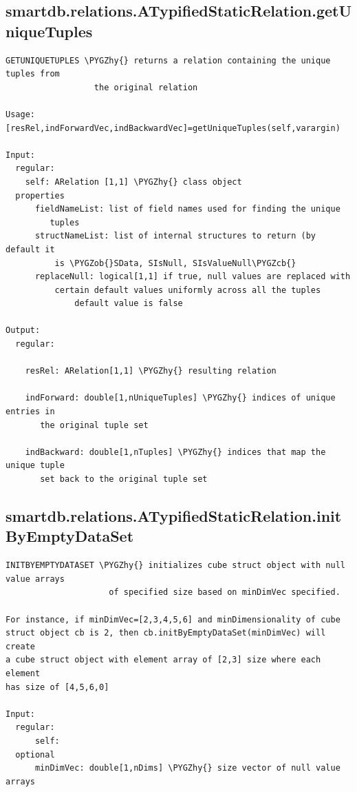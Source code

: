 \documentclass[letterpaper,10pt,english]{sphinxmanual}
\def\PYGZob{\char`\{}
\def\PYGZcb{\char`\}}
\def\PYGZhy{\char`\-}
\begin{document}
\subsection{smartdb.relations.ATypifiedStaticRelation.getUniqueTuples}
\label{chap_functions:smartdb-relations-atypifiedstaticrelation-getuniquetuples}
\begin{Verbatim}[commandchars=\\\{\}]
GETUNIQUETUPLES \PYGZhy{} returns a relation containing the unique tuples from
                  the original relation

Usage: [resRel,indForwardVec,indBackwardVec]=getUniqueTuples(self,varargin)

Input:
  regular:
    self: ARelation [1,1] \PYGZhy{} class object
  properties
      fieldNameList: list of field names used for finding the unique
         tuples
      structNameList: list of internal structures to return (by default it
          is \PYGZob{}SData, SIsNull, SIsValueNull\PYGZcb{}
      replaceNull: logical[1,1] if true, null values are replaced with
          certain default values uniformly across all the tuples
              default value is false

Output:
  regular:

    resRel: ARelation[1,1] \PYGZhy{} resulting relation

    indForward: double[1,nUniqueTuples] \PYGZhy{} indices of unique entries in
       the original tuple set

    indBackward: double[1,nTuples] \PYGZhy{} indices that map the unique tuple
       set back to the original tuple set
\end{Verbatim}


\subsection{smartdb.relations.ATypifiedStaticRelation.initByEmptyDataSet}
\label{chap_functions:smartdb-relations-atypifiedstaticrelation-initbyemptydataset}
\begin{Verbatim}[commandchars=\\\{\}]
INITBYEMPTYDATASET \PYGZhy{} initializes cube struct object with null value arrays
                     of specified size based on minDimVec specified.

For instance, if minDimVec=[2,3,4,5,6] and minDimensionality of cube
struct object cb is 2, then cb.initByEmptyDataSet(minDimVec) will create
a cube struct object with element array of [2,3] size where each element
has size of [4,5,6,0]

Input:
  regular:
      self:
  optional
      minDimVec: double[1,nDims] \PYGZhy{} size vector of null value arrays
\end{Verbatim}
\end{document}

